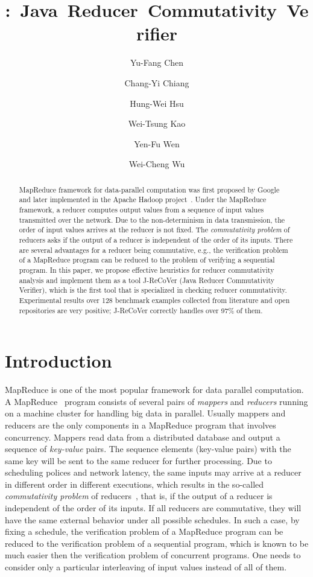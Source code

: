 \documentclass{llncs}
\title{\hspace{-0.1cm}{J-ReCoVer}:~Java~Reducer~Commutativity~Verifier}
\author{
Yu-Fang Chen\inst{1}\inst{2}
\and
Chang-Yi Chiang\inst{2}
\and
Hung-Wei Hsu\inst{1}
\and
Wei-Tsung Kao\inst{1}
\and
Yen-Fu Wen\inst{2}
\and
Wei-Cheng Wu\inst{1}
}
\institute
{
Institute of Information Science, Academia Sinica, Taiwan
\and
Graduate Institute of Information Management, National Taipei University, Taiwan
}
\begin{document}
\maketitle

\begin{abstract}

MapReduce framework for data-parallel computation was first proposed by Google~\cite{dean04} and later implemented in the Apache Hadoop project~\cite{hadoop}.
Under the MapReduce framework, a reducer computes output values from a sequence of input values transmitted over the network.  Due to the non-determinism in data transmission, the order of input values arrives at the reducer is not fixed.
The \emph{commutativity problem} of reducers asks if the output of a reducer is independent of the order of its inputs. There are several advantages for a reducer being commutative, e.g., the verification problem of a MapReduce program can be reduced to the problem of verifying a sequential program. 
In this paper, we propose effective heuristics for reducer commutativity analysis and implement them as a tool J-ReCoVer (Java Reducer Commutativity Verifier), which is the first tool that is specialized in checking reducer commutativity. Experimental results over 128 benchmark examples collected from literature and open repositories are very positive; J-ReCoVer correctly handles over 97\% of them.

\end{abstract}

\section{Introduction}
\label{section:introduction}

MapReduce is one of the most popular framework for data parallel computation.
A MapReduce~\cite{dean04,hadoop} program consists of several pairs of \emph{mappers} and \emph{reducers} running on a machine cluster for handling big data in parallel. Usually mappers and reducers are the only components in a MapReduce program that involves concurrency. Mappers read data from a distributed database and output a sequence of \emph{key-value} pairs. The sequence elements (key-value pairs) with the same key will be sent to the same reducer for further processing. Due to scheduling polices and network latency, the same inputs may arrive at a reducer in different order in different executions, which results in the so-called \emph{commutativity problem} of reducers~\cite{csallner13testing,xiao14mr,ChenHSW15,ChenSW16}, that is, if the output of a reducer is independent of the order of its inputs. 
If all reducers are commutative, they will have the same external behavior under all possible schedules. In such a case, by fixing a schedule, the verification problem of a MapReduce program can be reduced to the verification problem of a sequential program, which is known to be much easier then the verification problem of concurrent programs. One needs to consider only a particular interleaving of input values instead of all of them.
\end{document}
